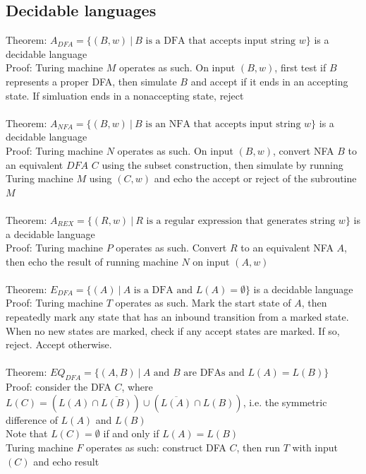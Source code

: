 \documentclass{article}
\newcommand*{\<}{\langle}
\renewcommand*{\>}{\rangle}
\begin{document}
		\subsection{Decidable languages}
			Theorem: $A_{DFA} = \{(B, w)\:|\:B\text{ is a DFA that accepts input string }w\}$ is a decidable language \\
			Proof: Turing machine $M$ operates as such. On input $(B, w)$, first test if $B$ represents a proper DFA, then simulate $B$ and accept if it ends in an accepting state. If simluation ends in a nonaccepting state, reject \\
			\\
			Theorem: $A_{NFA} = \{(B, w)\:|\:B\text{ is an NFA that accepts input string }w\}$ is a decidable language \\
			Proof: Turing machine $N$ operates as such. On input $(B, w)$, convert NFA $B$ to an equivalent $DFA$ $C$ using the subset construction, then simulate by running Turing machine $M$ using $(C, w)$ and echo the accept or reject of the subroutine $M$ \\
			\\
			Theorem: $A_{REX} = \{(R, w)\:|\:R\text{ is a regular expression that generates string }w\}$ is a decidable language \\
			Proof: Turing machine $P$ operates as such. Convert $R$ to an equivalent NFA $A$, then echo the result of running machine $N$ on input $(A, w)$ \\
			\\
			Theorem: $E_{DFA} = \{(A)\:|\:A\text{ is a DFA and }L(A) = \emptyset\}$ is a decidable language \\
			Proof: Turing machine $T$ operates as such. Mark the start state of $A$, then repeatedly mark any state that has an inbound transition from a marked state. When no new states are marked, check if any accept states are marked. If so, reject. Accept otherwise. \\
			\\
			Theorem: $EQ_{DFA} = \{(A, B)\:|\:A\text{ and }B\text{ are DFAs and }L(A) = L(B)\}$ \\
			Proof: consider the DFA $C$, where $L(C) = (L(A) \cap \overline{L(B)}) \cup (\overline{L(A)} \cap L(B))$, i.e. the symmetric difference of $L(A)$ and $L(B)$ \\
			Note that $L(C) = \emptyset$ if and only if $L(A) = L(B)$ \\
			Turing machine $F$ operates as such: construct DFA $C$, then run $T$ with input $(C)$ and echo result \\
\end{document}

